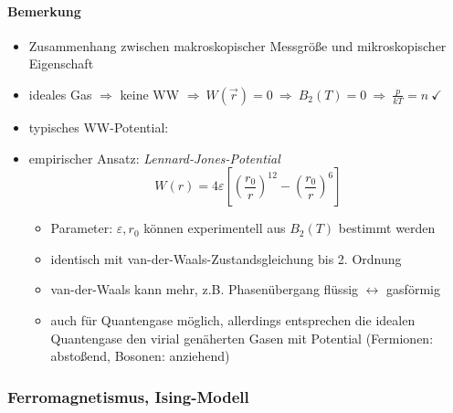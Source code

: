 \paragraph{Bemerkung}
\begin{itemize}
    \item Zusammenhang zwischen makroskopischer Messgröße und mikroskopischer Eigenschaft
    \item ideales Gas $\Rightarrow$ keine WW $\Rightarrow \ W(\Vec{r})=0 \ \Rightarrow \ B_2(T)=0 \ \Rightarrow \ \frac{p}{kT}=n \ \checkmark$
    \item typisches WW-Potential:
    \begin{center}
    \end{center}
    \item empirischer Ansatz: \emph{Lennard-Jones-Potential}
    \begin{equation}
        W(r) = 4\varepsilon \left[\left(\frac{r_0}{r}\right)^{12} - \left( \frac{r_0}{r}\right)^6\right] 
    \end{equation}
    \begin{itemize}
        \item[] Parameter: $\varepsilon,r_0$ können experimentell aus $B_2(T)$ bestimmt werden
        \item identisch mit van-der-Waals-Zustandsgleichung bis 2. Ordnung
        \item van-der-Waals kann mehr, z.B. Phasenübergang flüssig $\leftrightarrow$ gasförmig
        \item auch für Quantengase möglich, allerdings entsprechen die idealen Quantengase den virial genäherten Gasen mit Potential (Fermionen: abstoßend, Bosonen: anziehend)
    \end{itemize}
\end{itemize}

\subsubsection{Ferromagnetismus, Ising-Modell} 

